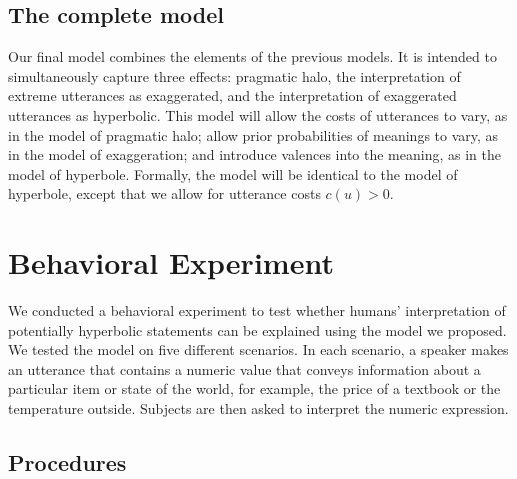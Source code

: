 \documentclass{article} %
\begin{document}
\subsection{The complete model}

Our final model combines the elements of the previous models. It is intended to simultaneously capture three effects: pragmatic halo, the interpretation of extreme utterances as exaggerated, and the interpretation of exaggerated utterances as hyperbolic. This model will allow the costs of utterances to vary, as in the model of pragmatic halo; allow prior probabilities of meanings to vary, as in the model of exaggeration; and introduce valences into the meaning, as in the model of hyperbole. Formally, the model will be identical to the model of hyperbole, except that we allow for utterance costs $c(u) > 0$. 

\section{Behavioral Experiment}

We conducted a behavioral experiment to test whether humans' interpretation of potentially hyperbolic statements can be explained using the model we proposed. We tested the model on five different scenarios. In each scenario, a speaker makes an utterance that contains a numeric value that conveys information about a particular item or state of the world, for example, the price of a textbook or the temperature outside. Subjects are then asked to interpret the numeric expression.

\subsection{Procedures}
\end{document}
